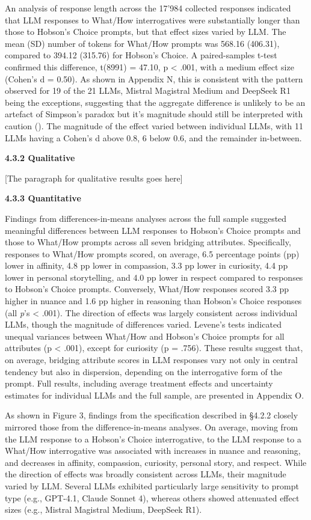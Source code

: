 \documentclass[
  12pt,
]{article}
\begin{document}
An analysis of response length across the 17'984 collected responses indicated that LLM responses to What/How interrogatives were substantially longer than those to Hobson's Choice prompts, but that effect sizes varied by LLM. The mean (SD) number of tokens for What/How prompts was 568.16 (406.31), compared to 394.12 (315.76) for Hobson's Choice. A paired-samples t-test confirmed this difference, t(8991) = 47.10, p \textless{} .001, with a medium effect size (Cohen's d = 0.50). As shown in Appendix N, this is consistent with the pattern observed for 19 of the 21 LLMs, Mistral Magistral Medium and DeepSeek R1 being the exceptions, suggesting that the aggregate difference is unlikely to be an artefact of Simpson's paradox but it's magnitude should still be interpreted with caution (). The magnitude of the effect varied between individual LLMs, with 11 LLMs having a Cohen's d above 0.8, 6 below 0.6, and the remainder in-between.

\textbf{4.3.2 Qualitative}

{[}The paragraph for qualitative results goes here{]}

\textbf{4.3.3 Quantitative}

Findings from differences-in-means analyses across the full sample suggested meaningful differences between LLM responses to Hobson's Choice prompts and those to What/How prompts across all seven bridging attributes. Specifically, responses to What/How prompts scored, on average, 6.5 percentage points (pp) lower in affinity, 4.8 pp lower in compassion, 3.3 pp lower in curiosity, 4.4 pp lower in personal storytelling, and 4.0 pp lower in respect compared to responses to Hobson's Choice prompts. Conversely, What/How responses scored 3.3 pp higher in nuance and 1.6 pp higher in reasoning than Hobson's Choice responses (all \emph{p}'s \textless{} .001). The direction of effects was largely consistent across individual LLMs, though the magnitude of differences varied. Levene's tests indicated unequal variances between What/How and Hobson's Choice prompts for all attributes (p \textless{} .001), except for curiosity (p = .756). These results suggest that, on average, bridging attribute scores in LLM responses vary not only in central tendency but also in dispersion, depending on the interrogative form of the prompt. Full results, including average treatment effects and uncertainty estimates for individual LLMs and the full sample, are presented in Appendix O.

As shown in Figure 3, findings from the specification described in §4.2.2 closely mirrored those from the difference-in-means analyses. On average, moving from the LLM response to a Hobson's Choice interrogative, to the LLM response to a What/How interrogative was associated with increases in nuance and reasoning, and decreases in affinity, compassion, curiosity, personal story, and respect. While the direction of effects was broadly consistent across LLMs, their magnitude varied by LLM. Several LLMs exhibited particularly large sensitivity to prompt type (e.g., GPT-4.1, Claude Sonnet 4), whereas others showed attenuated effect sizes (e.g., Mistral Magistral Medium, DeepSeek R1).
\end{document}
